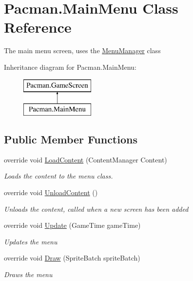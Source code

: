 \hypertarget{class_pacman_1_1_main_menu}{\section{Pacman.\-Main\-Menu Class Reference}
\label{class_pacman_1_1_main_menu}
}


The main menu screen, uses the \hyperlink{class_pacman_1_1_menu_manager}{Menu\-Manager} class  


Inheritance diagram for Pacman.\-Main\-Menu\-:\begin{figure}[H]
\begin{center}
\leavevmode
\includegraphics[height=2.000000cm]{class_pacman_1_1_main_menu}
\end{center}
\end{figure}
\subsection*{Public Member Functions}
\begin{DoxyCompactItemize}
\item 
override void \hyperlink{class_pacman_1_1_main_menu_afe334b467dd04341970f6a37521afbd5}{Load\-Content} (Content\-Manager Content)
\begin{DoxyCompactList}\small\item\em Loads the content to the menu class. \end{DoxyCompactList}\item 
override void \hyperlink{class_pacman_1_1_main_menu_a5081e962db4976366a69d7e762680edd}{Unload\-Content} ()
\begin{DoxyCompactList}\small\item\em Unloads the content, called when a new screen has been added \end{DoxyCompactList}\item 
override void \hyperlink{class_pacman_1_1_main_menu_aa93dfb885cc86654e2596168690e44c4}{Update} (Game\-Time game\-Time)
\begin{DoxyCompactList}\small\item\em Updates the menu \end{DoxyCompactList}\item 
override void \hyperlink{class_pacman_1_1_main_menu_aa1ea98563a955497e06808b440a65712}{Draw} (Sprite\-Batch sprite\-Batch)
\begin{DoxyCompactList}\small\item\em Draws the menu \end{DoxyCompactList}\end{DoxyCompactItemize}
